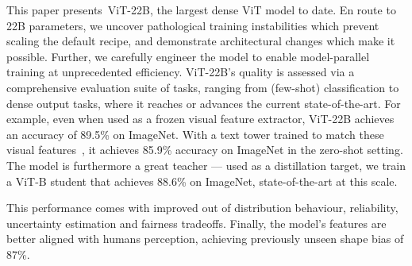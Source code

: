 \documentclass{article}
\newcommand{\chonk}{\mbox{ViT-22B}\xspace}
\begin{document}
This paper presents~\chonk{}, the largest dense ViT model to date. En route to 22B parameters, we uncover pathological training instabilities which prevent scaling the default recipe, and demonstrate architectural changes which make it possible. Further, we carefully engineer the model to enable model-parallel training at unprecedented efficiency.
\chonk{}'s quality is assessed via a comprehensive evaluation suite of tasks, ranging from (few-shot) classification to dense output tasks, where it reaches or advances the current state-of-the-art.
For example, even when used as a frozen visual feature extractor, \chonk achieves an accuracy of 89.5\% on ImageNet.
With a text tower trained to match these visual features~\citep{lit}, it achieves 85.9\% accuracy on ImageNet in the zero-shot setting.
The model is furthermore a great teacher --- used as a distillation target, we train a ViT-B student that achieves 88.6\% on ImageNet, state-of-the-art at this scale.

This performance comes with improved out of distribution behaviour, reliability, uncertainty estimation and fairness tradeoffs.
Finally, the model's features are better aligned with humans perception, achieving previously unseen shape bias of 87\%.









\iffalse
Things to highlight
\begin{itemize}
    \item Excellent linear eval (as good or better than full fintuning smaller models)
    \item Significantly better than existing models in learning general features for out of distribution classification (IN1k --> ObjectNet).
    \item Video classification --- small model on top of per-frame representations.
    \item Contrastive zero-shot --- gains over -e and -g, a bit worse than CoCa, but that's a different training paradigm.
    \item Competitive results on dense prediction (few-shot semantic segmentation, monocular depth), while the pretraining objective is per image classification. 
    \item Fairness: favorable tradeoff between bias and performance for all tested metrics
    \item Human alignment: highest ever recorded shape bias, improves alignment to human visual object recognition
    \item Calibration: remarkably improves the trade-off between accuracy and calibration. 
    \item Reliability (PLEX), gains on all metrics.
    \item Distillation: New state of the art at those sizes. 
\end{itemize}
\fi
\end{document}
